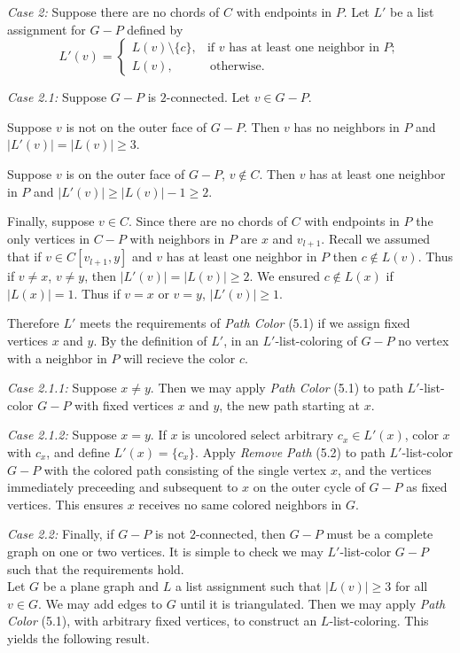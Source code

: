 \documentclass[letterpaper, 12pt]{article}
\theoremstyle{definition}
\theoremstyle{definition}
\theoremstyle{thm}
\theoremstyle{definition}
\begin{document}
\textit{Case 2:} Suppose there are no chords of $C$ with endpoints in $P$.
Let $L'$ be a list assignment for $G-P$ defined by
\[
	L'(v) = \begin{cases}
				L(v)\setminus\{c\}, & \text{if } v \text{ has at least one
				    neighbor in } P;\\
				L(v), & \ \text{otherwise}.
			\end{cases}
\]

\textit{Case 2.1:} Suppose $G-P$ is $2$-connected. Let $v\in G-P$.

Suppose $v$ is not on the outer face of $G-P$. Then $v$ has no neighbors in $P$
and $|L'(v)|=|L(v)|\ge 3$.

Suppose $v$ is on the outer face of $G-P$, $v\not\in C$. Then $v$ has at
least one neighbor in $P$ and $|L'(v)|\ge |L(v)|-1\ge 2$.

Finally, suppose $v\in C$. Since there are no chords of $C$ with endpoints in
$P$ the only vertices in $C-P$ with neighbors in $P$ are $x$ and $v_{l+1}$.
Recall we assumed that if $v\in C[v_{l+1},y]$ and $v$ has at least one neighbor
in $P$ then $c\not\in L(v)$. Thus if $v\ne x$, $v\ne y$, then
$|L'(v)|=|L(v)|\ge 2$. We ensured $c\not\in L(x)$ if $|L(x)|=1$. Thus if $v=x$
or $v=y$, $|L'(v)|\ge 1$.

Therefore $L'$ meets the requirements of \textit{Path Color}
(5.1) if we assign fixed vertices $x$ and $y$. By the definition of $L'$, in an
$L'$-list-coloring of $G-P$ no vertex with a neighbor in $P$ will recieve the
color $c$.

\textit{Case 2.1.1:} Suppose $x\ne y$. Then we may apply \textit{Path Color}
(5.1) to path $L'$-list-color $G-P$ with fixed vertices $x$ and $y$, the new
path starting at $x$.

\textit{Case 2.1.2:} Suppose $x=y$. If $x$ is uncolored select arbitrary
$c_x\in L'(x)$, color $x$ with $c_x$, and define $L'(x)=\{c_x\}$. Apply
\textit{Remove Path} (5.2) to path $L'$-list-color $G-P$
with the colored path consisting of the single vertex $x$, and the vertices
immediately preceeding and subsequent to $x$ on the outer
cycle of $G-P$ as fixed vertices. This ensures $x$ receives no same colored
neighbors in $G$.

\textit{Case 2.2:} Finally, if $G-P$ is not $2$-connected, then $G-P$ must be a
complete graph on one or two vertices. It is simple to check we may
$L'$-list-color $G-P$ such that the requirements hold.\\

Let $G$ be a plane graph and $L$ a list assignment such that $|L(v)|\ge 3$
for all $v\in G$. We may add edges to $G$ until it is triangulated. Then
we may apply \textit{Path Color} (5.1), with arbitrary fixed vertices, to
construct an $L$-list-coloring. This yields the following result.
\end{document}
